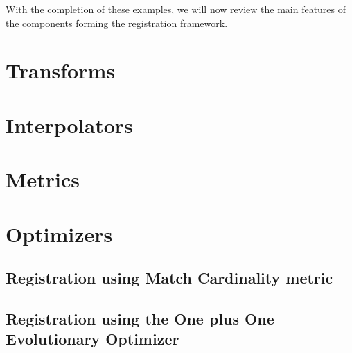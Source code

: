 With the completion of these examples, we will now review the main
features of the components forming the registration framework.


\clearpage

\section{Transforms}
\label{sec:Transforms}
\ifitkFullVersion

\fi



\clearpage

\section{Interpolators}
\label{sec:Interpolators}
\ifitkFullVersion

\fi

\clearpage

\section{Metrics}
\label{sec:Metrics}
\ifitkFullVersion

\fi

\clearpage

\section{Optimizers}
\label{sec:Optimizers}
\ifitkFullVersion

\fi



\subsection{Registration using Match Cardinality metric}
\label{sec:RegistrationMatchCardinality}
\ifitkFullVersion

\fi


\subsection{Registration using the One plus One Evolutionary Optimizer}
\label{sec:RegistrationOnePlusOne}
\ifitkFullVersion

\fi



